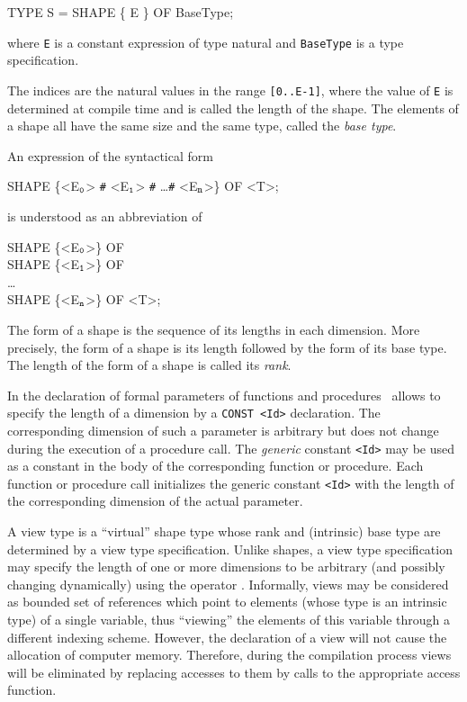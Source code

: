 \begin{frag}
TYPE S = SHAPE \{ E \} OF BaseType;
\end{frag}

\noindent where {\tt E} is a constant expression of type natural and
{\tt BaseType} is a type specification.

The indices are the natural values in the range {\tt [0..E-1]}, where
the value of {\tt E} is determined at compile time and is called the
length of the shape. The elements of a shape all have the same size
and the same type, called the {\em base type}.

An expression of the syntactical form

\begin{frag}
SHAPE \{<E$_{\tt 0}$>  \verb'#' <E$_{\tt 1}$>  \verb'#' \ldots \verb'#'
<E$_{\tt n}$>\} OF <T>; 
\end{frag}

\noindent is understood as an abbreviation of 

\begin{frag}
SHAPE \{<E$_{\tt 0}$>\} OF\\
\> SHAPE \{<E$_{\tt 1}$>\} OF\\
\>\> \dots\\
\>\>\> SHAPE \{<E$_{\tt n}$>\} OF <T>;
\end{frag}

\noindent The form of a shape is the sequence of its lengths in each
dimension. More precisely, the form of a shape is its length followed
by the form of its base type. The length of the form of a shape is
called its {\em rank}.

In the declaration of formal parameters of functions and procedures
\Booster\ allows to specify the length of a dimension by a
\texttt{CONST <Id>} declaration. The corresponding
dimension of such a parameter is arbitrary but does not change during
the execution of a procedure call. The {\em generic} constant
\texttt{<Id>} may be used as a constant in the body of the
corresponding function or procedure. Each function or procedure call
initializes the generic constant \texttt{<Id>} with the length of the
corresponding dimension of the actual parameter.

A view type is a ``virtual'' shape type whose rank and (intrinsic)
base type are determined by a view type specification. Unlike shapes,
a view type specification may specify the length of one or more
dimensions to be arbitrary (and possibly changing dynamically) using
the operator \T{*}. Informally, views may be considered as bounded set
of references which point to elements (whose type is an intrinsic
type) of a single variable, thus ``viewing'' the elements of this
variable through a different indexing scheme. However, the declaration
of a view will not cause the allocation of computer memory. Therefore,
during the compilation process views will be eliminated by replacing
accesses to them by calls to the appropriate access function.

